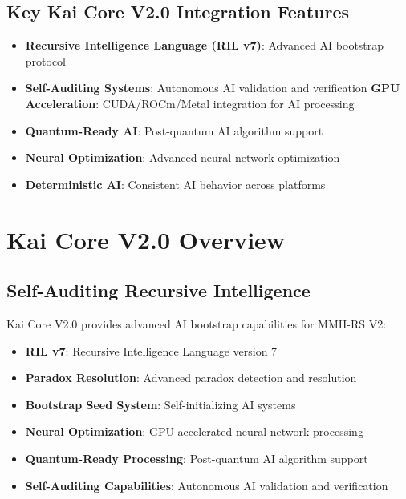 \documentclass[12pt,a4paper]{article}
\begin{document}
\subsection{Key Kai Core V2.0 Integration Features}
\begin{itemize}
    \item \textbf{Recursive Intelligence Language (RIL v7)}: Advanced AI bootstrap protocol
    \item \textbf{Self-Auditing Systems}: Autonomous AI validation and verification
    \textbf{GPU Acceleration}: CUDA/ROCm/Metal integration for AI processing
    \item \textbf{Quantum-Ready AI}: Post-quantum AI algorithm support
    \item \textbf{Neural Optimization}: Advanced neural network optimization
    \item \textbf{Deterministic AI}: Consistent AI behavior across platforms
\end{itemize}

\section{Kai Core V2.0 Overview}

\subsection{Self-Auditing Recursive Intelligence}
Kai Core V2.0 provides advanced AI bootstrap capabilities for MMH-RS V2:

\begin{itemize}
    \item \textbf{RIL v7}: Recursive Intelligence Language version 7
    \item \textbf{Paradox Resolution}: Advanced paradox detection and resolution
    \item \textbf{Bootstrap Seed System}: Self-initializing AI systems
    \item \textbf{Neural Optimization}: GPU-accelerated neural network processing
    \item \textbf{Quantum-Ready Processing}: Post-quantum AI algorithm support
    \item \textbf{Self-Auditing Capabilities}: Autonomous AI validation and verification
\end{itemize}
\end{document}
